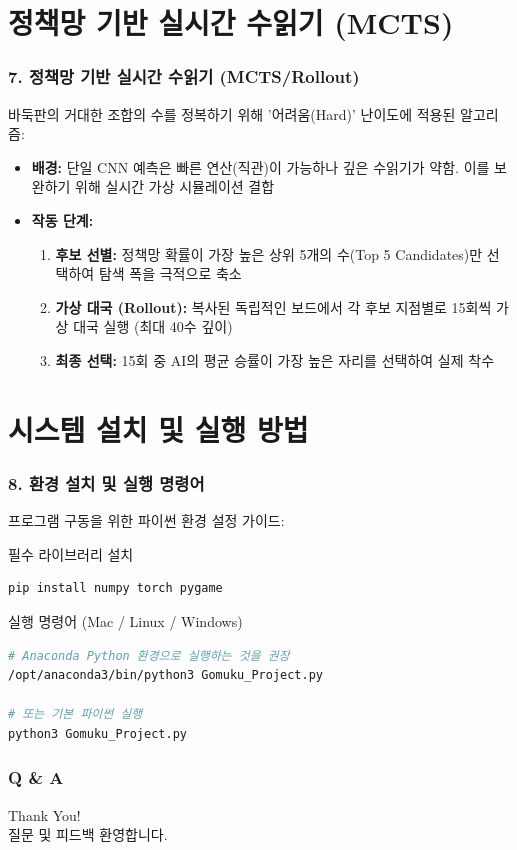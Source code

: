 \documentclass{beamer}
\begin{document}
\section{정책망 기반 실시간 수읽기 (MCTS)}
\begin{frame}
\frametitle{7. 정책망 기반 실시간 수읽기 (MCTS/Rollout)}
바둑판의 거대한 조합의 수를 정복하기 위해 '어려움(Hard)' 난이도에 적용된 알고리즘:
\begin{itemize}
    \item \textbf{배경:} 단일 CNN 예측은 빠른 연산(직관)이 가능하나 깊은 수읽기가 약함. 이를 보완하기 위해 실시간 가상 시뮬레이션 결합
    \item \textbf{작동 단계:}
    \begin{enumerate}
        \item \textbf{후보 선별:} 정책망 확률이 가장 높은 상위 5개의 수(Top 5 Candidates)만 선택하여 탐색 폭을 극적으로 축소
        \item \textbf{가상 대국 (Rollout):} 복사된 독립적인 보드에서 각 후보 지점별로 15회씩 가상 대국 실행 (최대 40수 깊이)
        \item \textbf{최종 선택:} 15회 중 AI의 평균 승률이 가장 높은 자리를 선택하여 실제 착수
    \end{enumerate}
\end{itemize}
\end{frame}

\section{시스템 설치 및 실행 방법}
\begin{frame}[fragile]
\frametitle{8. 환경 설치 및 실행 명령어}
프로그램 구동을 위한 파이썬 환경 설정 가이드:
\begin{block}{필수 라이브러리 설치}
    \begin{lstlisting}[language=bash,basicstyle=\small\ttfamily]
pip install numpy torch pygame
    \end{lstlisting}
\end{block}

\begin{block}{실행 명령어 (Mac / Linux / Windows)}
    \begin{lstlisting}[language=bash,basicstyle=\small\ttfamily]
# Anaconda Python 환경으로 실행하는 것을 권장
/opt/anaconda3/bin/python3 Gomuku_Project.py

# 또는 기본 파이썬 실행
python3 Gomuku_Project.py
    \end{lstlisting}
\end{block}
\end{frame}

\begin{frame}
\frametitle{Q \& A}
\begin{center}
    \Huge Thank You! \\[1cm]
    \large 질문 및 피드백 환영합니다.
\end{center}
\end{frame}
\end{document}
